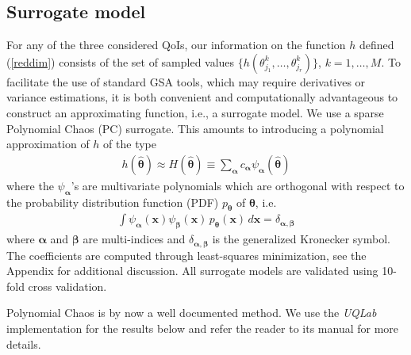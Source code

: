 \subsection{Surrogate model}
\label{sec:surrogate}
For any of the three considered QoIs, our information on the function $h$ defined (\ref{reddim}) consists of the set of sampled values $\{ h(\theta_{j_1}^k, \dots, \theta_{j_r}^k)\}$, $k=1, \dots, M$.  To facilitate the use of standard GSA tools, which may require derivatives or variance estimations, it is both convenient and computationally advantageous to construct an approximating function, i.e., a surrogate model. 
We use a sparse Polynomial Chaos (PC) surrogate. This amounts to introducing a polynomial approximation of $h$ of the type
\begin{eqnarray}
h(\hat{\boldsymbol{\theta}}) \approx H(\hat{\boldsymbol{\theta}}) \equiv \sum_{\boldsymbol{\alpha}} c_{\boldsymbol{\alpha}} \psi_{\boldsymbol{\alpha}}(\hat{\boldsymbol{\theta}}) \label{pce}
\end{eqnarray}
where the $\psi_{\boldsymbol{\alpha}}$'s are multivariate polynomials which are orthogonal with respect to the probability distribution function (PDF) $p_{\boldsymbol{\theta}}$ of $\boldsymbol{\theta}$, i.e.
\begin{eqnarray}
\int \psi_{\boldsymbol{\alpha}}(\mathbf x) \psi_{\boldsymbol{\beta}}(\mathbf x)\, p_{\boldsymbol{\theta}}(\mathbf x) \, d\mathbf{x} = \delta _{\boldsymbol{\alpha},\boldsymbol{\beta}} \label{ortho}
\end{eqnarray}
where $\boldsymbol{\alpha}$ and $\boldsymbol{\beta}$ are multi-indices and $\delta _{\boldsymbol{\alpha},\boldsymbol{\beta}}$ is the generalized Kronecker symbol. The coefficients are computed through least-squares minimization, see the Appendix for additional discussion. All surrogate models are validated using 10-fold cross validation.

Polynomial Chaos is by now a well documented method. We use the \textit{UQLab} implementation for the results below and refer the reader to its manual \cite{uqlab} for more details.


